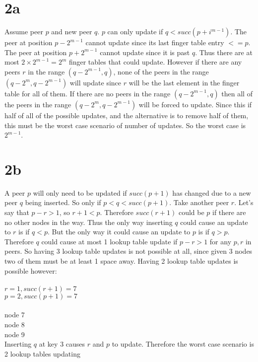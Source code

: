 \documentclass{article}
\begin{document}
\section*{2a}
Assume peer $p$ and new peer $q$. $p$ can only update if $q < succ(p + i^{m-1})$. The peer at position
$p - 2^{m-1}$ cannot update since its last finger table entry $<= p$. The peer at
position $p + 2^{m-1}$ cannot update since it is past $q$. Thus there are at most
$2\times2^{m-1}=2^m$ finger tables that could update. However if there are any peers $r$
in the range $(q - 2^{m-1}, q)$, none of the peers in the range $(q - 2^m, q - 2^{m-1})$
will update since $r$ will be the last element in the finger table for all of
them. If there are no peers in the range $(q - 2^{m-1}, q)$ then all of the peers in
the range $(q - 2^m, q - 2^{m-1})$ will be forced to update.  Since this if half of
all of the possible updates, and the alternative is to remove half of them, this
must be the worst case scenario of number of updates. So the worst case is $2^{m-1}$.


\section*{2b}
A peer $p$ will only need to be updated if $succ(p + 1)$ has changed due to a new peer $q$ being inserted.
So only if $p < q < succ(p + 1)$.
Take another peer $r$.
Let's say that $p - r > 1$, so $r + 1 < p$.
Therefore $succ(r + 1)$ could be $p$ if there are no other nodes in the way.
Thus the only way inserting $q$ could cause an update to $r$ is if $q < p$.
But the only way it could cause an update to $p$ is if $q > p$.
Therefore $q$ could cause at most 1 lookup table update if $p - r > 1$ for any $p, r$ in peers.
So having 3 lookup table updates is not possible at all, since given 3 nodes two of them must be at least 1 space away.
Having 2 lookup table updates is possible however:\\
\\
$r = 1, succ(r + 1) = 7$\\
$p = 2, succ(p + 1) = 7$\\
\\
node 7\\
node 8\\
node 9\\

Inserting $q$ at key 3 causes $r$ and $p$ to update.
Therefore the worst case scenario is 2 lookup tables updating
\end{document}
